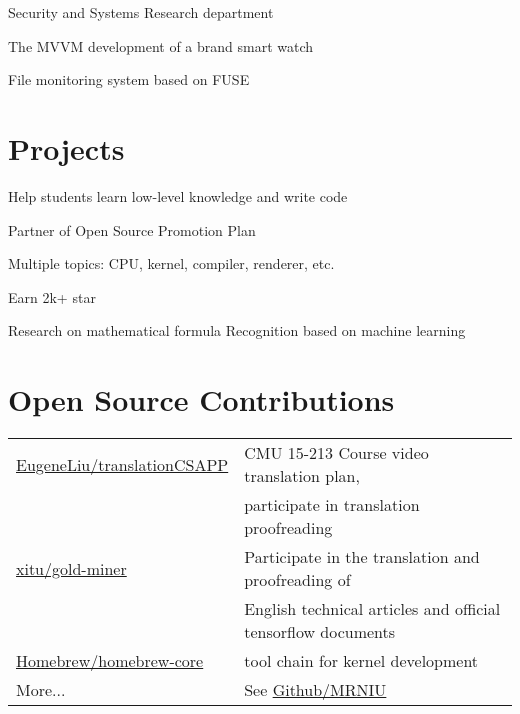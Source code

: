 \documentclass[]{deedy-resume-openfont}
\begin{document}
\begin{minipage}[t]{0.73\textwidth}
\begin{tightemize}
\item Security and Systems Research department
\item The MVVM development of a brand smart watch
\item File monitoring system based on FUSE
\end{tightemize}
\sectionsep


\section{Projects}
\begin{tightemize}
    \item Help students learn low-level knowledge and write code
    \item Partner of Open Source Promotion Plan
    \item Multiple topics: CPU, kernel, compiler, renderer, etc.
    \item Earn 2k+ star
    \end{tightemize}
\sectionsep

\begin{tightemize}
    \item Research on mathematical formula Recognition based on machine learning
    \end{tightemize}
\sectionsep


\section{Open Source Contributions}
\begin{tabular}{ll}
    \href{https://github.com/EugeneLiu/translationCSAPP}{EugeneLiu/translationCSAPP} & CMU 15-213 Course video translation plan, \\
        & participate in translation proofreading \\
    \href{https://github.com/xitu/gold-miner}{xitu/gold-miner} & Participate in the translation and proofreading of \\
        & English technical articles and official tensorflow documents \\
    \href{https://github.com/Homebrew/homebrew-core}{Homebrew/homebrew-core} & tool chain for kernel development \\
    More... & See \href{https://github.com/MRNIU}{Github/MRNIU}
\end{tabular}
\sectionsep


\end{minipage}
\end{document}
